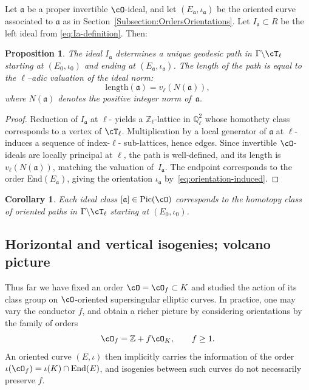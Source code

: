 \documentclass[10pt]{amsart}
\theoremstyle{theostyle}
\newtheorem{corollary}{Corollary}
\newtheorem{proposition}{Proposition}
\newcommand{\QQ}{\mathbb{Q}} \newcommand{\RR}{\mathbb{R}}
\newcommand{\ZZ}{\mathbb{Z}}
\renewcommand{\fa}{\mathfrak{a}} \newcommand{\fb}{\mathfrak{b}} \newcommand{\fc}{\mathfrak{c}}
\newcommand{\End}{\mathrm{End}}
\newcommand{\Pic}{\mathrm{Pic}}
\begin{document}
Let $\fa$ be a proper invertible $\cO$-ideal, and let
$(E_\fa,\iota_\fa)$ be the oriented curve associated to $\fa$ as in
Section~\ref{Subsection:OrdersOrientations}.
Let $I_\fa \subset R$ be the left ideal from \eqref{eq:Ia-definition}.
Then:

\begin{proposition}
	\label{prop:path-length}
	The ideal $I_\fa$ determines a unique geodesic path in $\Gamma\backslash\cT_\ell$
	starting at $(E_0,\iota_0)$ and ending at $(E_\fa,\iota_\fa)$.
	The length of the path is equal to the $\ell$--adic valuation of the ideal norm:
	\[
	\mathrm{length}(\fa)=v_\ell(N(\fa)),
	\]
	where $N(\fa)$ denotes the positive integer norm of~$\fa$.
\end{proposition}

\begin{proof}
	Reduction of $I_\fa$ at $\ell$- yields a $\ZZ_\ell$-lattice in $\QQ_\ell^2$ whose
	homothety class corresponds to a vertex of $\cT_\ell$.
	Multiplication by a local generator of $\fa$ at $\ell$- induces a sequence of
	index-$\ell$- sub-lattices, hence edges.  
	Since invertible $\cO$-ideals are locally principal at $\ell$, the path is
	well-defined, and its length is $v_\ell(N(\fa))$, matching the valuation of~$I_\fa$.
	The endpoint corresponds to the order $\End(E_\fa)$, giving the orientation
	$\iota_\fa$ by~\eqref{eq:orientation-induced}.
\end{proof}

\begin{corollary}
	Each ideal class $[\fa]\in\Pic(\cO)$ corresponds to the homotopy class of
	oriented paths in $\Gamma\backslash\cT_\ell$ starting at $(E_0,\iota_0)$.
\end{corollary}

\subsection{Horizontal and vertical isogenies; volcano picture}
\label{subsec:volcano}

Thus far we have fixed an order $\cO=\cO_f\subset K$ and studied the action of
its class group on $\cO$-oriented supersingular elliptic curves.  In practice,
one may vary the conductor $f$, and obtain a richer picture by considering
orientations by the family of orders
\[
\cO_f=\ZZ+f\cO_K, \qquad f\ge 1.
\]
An oriented curve $(E,\iota)$ then implicitly carries the information of
the order $\iota(\cO_f)=\iota(K)\cap\End(E)$, and isogenies between such
curves do not necessarily preserve $f$.
\end{document}
